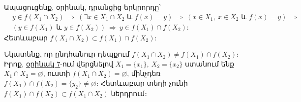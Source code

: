 \documentclass[./main.tex]{subfiles}
\begin{document}
\begin{varproof}
Ապացուցենք, օրինակ, դրանցից երկրորդը՝
\begin{equation*}
    \begin{aligned}
    &y\in f(X_1\cap X_2)\ \Rightarrow \ (\exists x\in X_1\cap X_2 \textrm{ և } f(x)=y)\ \Rightarrow \ (x\in X_1,\ x\in X_2 \textrm{ և } f(x)=y)\ \Rightarrow \\ &\left(y\in f(X_1)\textrm{ և } y\in f(X_2)\right)\ \Rightarrow \ y\in f(X_1)\cap f(X_2):
    \end{aligned}
\end{equation*}
Հետևաբար $f(X_1\cap X_2)\subset  f(X_1)\cap f(X_2)$:
\end{varproof}
\par Նկատենք, որ ընդհանուր դեպքում $f(X_1\cap X_2)\neq f(X_1)\cap f(X_2)$։ Իրոք, \hyperref[ch1ex7]{օրինակ 7}-ում վերցնելով $X_1=\{x_1\},\ X_2=\{x_2\}$ ստանում ենք $X_1\cap X_2=\varnothing$, ուստի $f(X_1\cap X_2)=\varnothing$, մինչդեռ $f(X_1)\cap f(X_2)=\{y_2\} \neq \varnothing$։ Հետևաբար տեղի չունի $f(X_1) \cap f(X_2) \subset f(X_1 \cap X_2)$ ներդրում։

\end{document}
